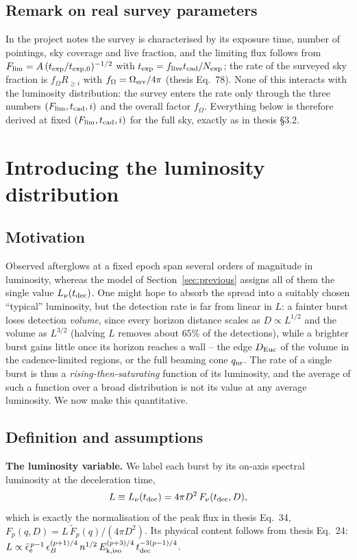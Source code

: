 \documentclass[11pt,a4paper]{article}
\newcommand{\tF}{\tilde{F}}
\newcommand{\Euc}{{\rm Euc}}
\newcommand{\nr}{{\rm nr}}
\newcommand{\Flim}{F_{\rm lim}}
\newcommand{\tcad}{t_{\rm cad}}
\newcommand{\tdec}{t_{\rm dec}}
\newcommand{\Lnu}{L_\nu(t_{\rm dec})}
\begin{document}
\subsection{Remark on real survey parameters}

In the project notes the survey is characterised by its exposure time, number of pointings, sky coverage and live fraction, and the limiting flux follows from $\Flim=A\,(t_{\exp}/t_{\exp,0})^{-1/2}$ with $t_{\exp}=f_{\rm live}\tcad/N_{\exp}$; the rate of the surveyed sky fraction is $f_\Omega R_{\geq i}$ with $f_\Omega=\Omega_{\rm srv}/4\pi$ (thesis Eq.~78). None of this interacts with the luminosity distribution: the survey enters the rate only through the three numbers $(\Flim,\tcad,i)$ and the overall factor $f_\Omega$. Everything below is therefore derived at fixed $(\Flim,\tcad,i)$ for the full sky, exactly as in thesis \S3.2.

\section{Introducing the luminosity distribution}
\label{sec:lf}

\subsection{Motivation}

Observed afterglows at a fixed epoch span several orders of magnitude in luminosity, whereas the model of Section~\ref{sec:previous} assigns all of them the single value $\Lnu$. One might hope to absorb the spread into a suitably chosen ``typical'' luminosity, but the detection rate is far from linear in $L$: a fainter burst loses detection \emph{volume}, since every horizon distance scales as $D\propto L^{1/2}$ and the volume as $L^{3/2}$ (halving $L$ removes about $65\%$ of the detections), while a brighter burst gains little once its horizon reaches a wall -- the edge $D_\Euc$ of the volume in the cadence-limited regions, or the full beaming cone $q_\nr$. The rate of a single burst is thus a \emph{rising-then-saturating} function of its luminosity, and the average of such a function over a broad distribution is not its value at any average luminosity. We now make this quantitative.

\subsection{Definition and assumptions}

\noindent\textbf{The luminosity variable.} We label each burst by its on-axis spectral luminosity at the deceleration time,
\begin{equation}
L\equiv\Lnu=4\pi D^2\,F_\nu(\tdec,D),
\end{equation}
which is exactly the normalisation of the peak flux in thesis Eq.~34, $F_p(q,D)=L\,\tF_p(q)/(4\pi D^2)$. Its physical content follows from thesis Eq.~24: $L\propto\bar\epsilon_e^{\,p-1}\,\epsilon_B^{(p+1)/4}\,n^{1/2}\,E_{\rm k,iso}^{(p+3)/4}\,\tdec^{-3(p-1)/4}$.
\end{document}
